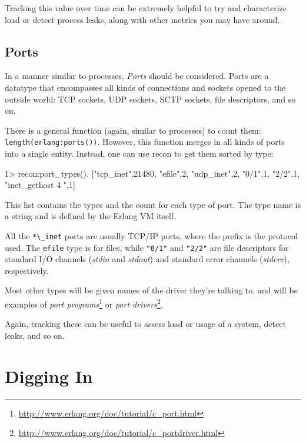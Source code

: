 \documentclass[11pt, oneside]{book}   	%
\newcommand{\expression}[1]{\Verb`#1`}
\begin{document}
Tracking this value over time can be extremely helpful to try and characterize load or detect process leaks, along with other metrics you may have around.

\subsection{Ports}
\label{subsec:global-ports}

In a manner similar to processes, \emph{Ports} should be considered. Ports are a datatype that encompasses all kinds of connections and sockets opened to the outside world: TCP sockets, UDP sockets, SCTP sockets, file descriptors, and so on.

There is a general function (again, similar to processes) to count them: \expression{length(erlang:ports())}. However, this function merges in all kinds of ports into a single entity. Instead, one can use recon to get them sorted by type:

\begin{VerbatimEshell}
1> recon:port_types().
[{"tcp_inet",21480},
 {"efile",2},
 {"udp_inet",2},
 {"0/1",1},
 {"2/2",1},
 {"inet_gethost 4 ",1}]
 \end{VerbatimEshell}

This list contains the types and the count for each type of port. The type name is a string and is defined by the Erlang VM itself.

All the \expression{*\_inet} ports are usually TCP/IP ports, where the prefix is the protocol used. The \expression{efile} type is for files, while \expression{"0/1"} and \expression{"2/2"} are file descriptors for standard I/O channels (\emph{stdin} and \emph{stdout}) and standard error channels (\emph{stderr}), respectively.

Most other types will be given names of the driver they're talking to, and will be examples of \emph{port programs}\footnote{\href{http://www.erlang.org/doc/tutorial/c\_port.html}{http://www.erlang.org/doc/tutorial/c\_port.html}} or \emph{port drivers}\footnote{\href{http://www.erlang.org/doc/tutorial/c\_portdriver.html}{http://www.erlang.org/doc/tutorial/c\_portdriver.html}}.

Again, tracking these can be useful to assess load or usage of a system, detect leaks, and so on.

\section{Digging In}
\label{sec:digging-in}
\end{document}
